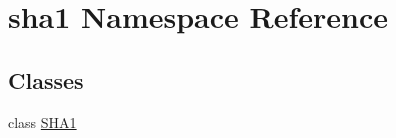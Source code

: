 \hypertarget{namespacesha1}{\section{sha1 Namespace Reference}
\label{namespacesha1}
}
\subsection*{Classes}
\begin{DoxyCompactItemize}
\item 
class \hyperlink{classsha1_1_1_s_h_a1}{S\-H\-A1}
\end{DoxyCompactItemize}
